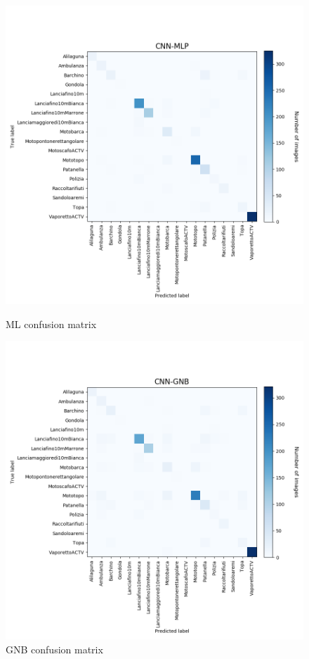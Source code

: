 \documentclass[12pt]{article}
\begin{document}
\begin{figure}[!ht]
	\centering
	\begin{minipage}{.5\textwidth}
		\centering
		\includegraphics[width=.9\linewidth]{../code/output/CNN-MLP.png}
		\caption{ML confusion matrix} 
		\label{fig:cnf_mlp}
	\end{minipage}%
	\begin{minipage}{.5\textwidth}
		\centering
		\includegraphics[width=.9\linewidth]{../code/output/CNN-GNB.png}
		\caption{GNB confusion matrix} 
		\label{fig:cnf_gnb}
	\end{minipage}
\end{figure}
\end{document}
